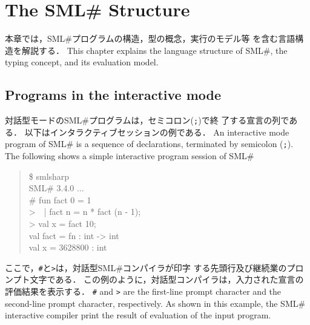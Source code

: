 \documentclass{jbook}
\newcommand{\txt}[2]{#2}
\newcommand{\smlsharp}{SML\#}
\newcommand{\version}{3.4.0}
\newcommand{\code}[1]{\mbox{\large\tt #1}}
\newcommand{\term}[1]{\mbox{{\tt #1}}}
\newcommand{\myem}{\mbox{\ \ }}
\newenvironment{program}{\begin{quote}\begin{tt}}%
                        {\end{tt}\end{quote}}
\begin{document}
\chapter{\txt{\smlsharp{}の構造}{The \smlsharp{} Structure}}
\label{chap:reference:structures}

\ifjp%
	本章では，\smlsharp{}プログラムの構造，型の概念，実行のモデル等
を含む言語構造を解説する．
\else%
	This chapter explains the language structure of \smlsharp{},
the typing concept, and its evaluation model.
\fi%

\section{\txt{対話型モードのプログラム}{Programs in the interactive mode}}
\label{spec:sec:interactiveProgram}
\ifjp%
	対話型モードの\smlsharp{}プログラムは，セミコロン(\term{;})で終
了する宣言の列である．
	以下はインタラクティブセッションの例である．
\else%
	An interactive mode program of \smlsharp{} is a sequence of
declarations, terminated by semicolon (\term{;}).
	The following shows a simple interactive program session of \smlsharp{}	
\fi%

\begin{program}
  \$ smlsharp\\
  SML\# \version{} ...\\
  \# fun fact 0 = 1\\
  >\myem   | fact n = n * fact (n - 1);\\
  > val x = fact 10;\\
  val fact = fn : int -> int\\
  val x = 3628800 : int
\end{program}

\ifjp%
	ここで，\code{\#}と\code{>}は，対話型\smlsharp{}コンパイラが印字
する先頭行及び継続業のプロンプト文字である．
	この例のように，対話型コンパイラは，入力された宣言の評価結果を表示する．
\else%
	\code{\#} and \code{>} are the first-line prompt character and
the second-line prompt character, respectively. 
	As shown in this example, the \smlsharp{} interactive compiler
print the result of evaluation of the input program.
\fi%
\end{document}

